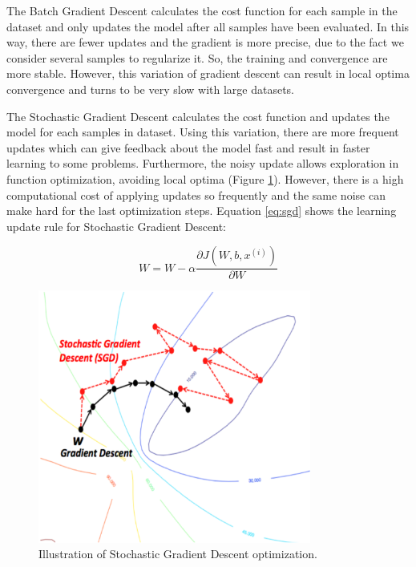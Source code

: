 The Batch Gradient Descent calculates the cost function for each sample in the dataset and only updates the model after all samples have been evaluated. In this way, there are fewer updates and the gradient is more precise, due to the fact we consider several samples to regularize it. So, the training and convergence are more stable. However, this variation of gradient descent can result in local optima convergence and turns to be very slow with large datasets.

The Stochastic Gradient Descent calculates the cost function and updates the model for each samples in dataset. Using this variation, there are more frequent updates which can give feedback about the model fast and result in faster learning to some problems. Furthermore, the noisy update allows exploration in function optimization, avoiding local optima (Figure \ref{fig:batchvsstochastic}). However, there is a high computational cost of applying updates so frequently and the same noise can make hard for the last optimization steps. Equation \ref{eq:sgd} shows the learning update rule for Stochastic Gradient Descent:

\begin{equation}
W = W - \alpha\frac{\partial{J(W,b, x^{(i)})}}{\partial{W}}
\label{eq:sgd}
\end{equation}

\begin{figure}[!htbp]
	\centering
	\includegraphics[width=0.8\textwidth]{Cap3/batchvsstochastic.eps}
	\caption{Illustration of 	Stochastic Gradient Descent optimization.
	}
	\label{fig:batchvsstochastic}
\end{figure}


